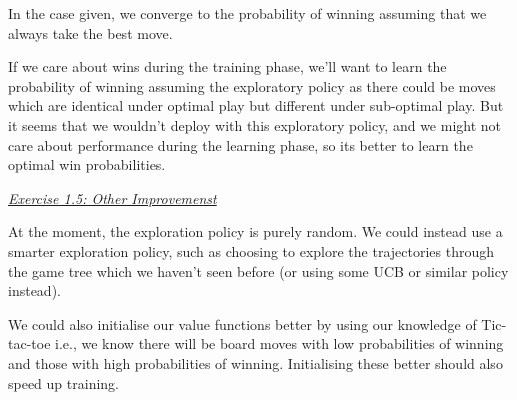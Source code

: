 \documentclass{article}
\newcommand{\myq}[1]{%
	\vspace{1em}
	\noindent\underline{\emph{Exercise #1}}\vspace{0.25em}\linebreak
}
\begin{document}
In the case given, we converge to the probability of winning assuming that we always take the best move. 

If we care about wins during the training phase, we'll want to learn the probability of winning assuming the exploratory policy as there could be moves which are identical under optimal play but different under sub-optimal play. But it seems that we wouldn't deploy with this exploratory policy, and we might not care about performance during the learning phase, so its better to learn the optimal win probabilities. 

\myq{1.5: Other Improvemenst}
At the moment, the exploration policy is purely random. We could instead use a smarter exploration policy, such as choosing to explore the trajectories through the game tree which we haven't seen before (or using some UCB or similar policy instead). 

We could also initialise our value functions better by using our knowledge of Tic-tac-toe i.e., we know there will be board moves with low probabilities of winning and those with high probabilities of winning. Initialising these better should also speed up training. 
\end{document}
